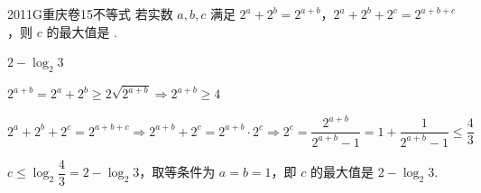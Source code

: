 
\begin{problem}{2011}{G}{重庆卷}{15}{不等式}
若实数 $ a,b,c $ 满足 $ 2^a+2^b=2^{a+b} $，$ 2^a+2^b+2^c=2^{a+b+c} $，则 $ c $ 的最大值是 \underline{\hspace{4em}}.
\end{problem}

\begin{answer}
$ 2-\log_2 3 $
\end{answer}

\begin{solutions}
$ 2^{a+b}=2^a+2^b\geqslant 2\sqrt{2^{a+b}} \Rightarrow 2^{a+b}\geqslant 4 $

$ 2^a+2^b+2^c=2^{a+b+c} \Rightarrow 2^{a+b}+2^c=2^{a+b}\cdot 2^c \Rightarrow 2^c=\dfrac{2^{a+b}}{2^{a+b}-1}=1+\dfrac{1}{2^{a+b}-1}\leqslant \dfrac{4}{3} $

$ c\leqslant \log_2 \dfrac{4}{3}=2-\log_2 3 $，取等条件为 $ a=b=1 $，即 $ c $ 的最大值是 $ 2-\log_2 3 $.
\end{solutions}